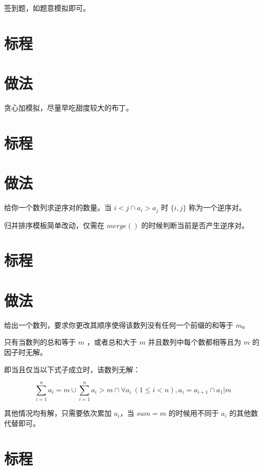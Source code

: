 \documentclass{../cpct/ctsol}
\begin{document}
签到题，如题意模拟即可。

\section*{标程}


\makesolution
\section*{做法}

贪心加模拟，尽量早吃甜度较大的布丁。

\section*{标程}


\makesolution
\section*{做法}

给你一个数列求逆序对的数量。当 $i < j \cap a_i > a_j$ 时 $\{i,j\}$ 称为一个逆序对。

归并排序模板简单改动，仅需在 $merge()$ 的时候判断当前是否产生逆序对。

\section*{标程}


\makesolution
\section*{做法}

给出一个数列，要求你更改其顺序使得该数列没有任何一个前缀的和等于 $m$。

只有当数列的总和等于 $m$ ，或者总和大于 $m$ 并且数列中每个数都相等且为 $m$ 的因子时无解。

即当且仅当以下式子成立时，该数列无解：

$$
\sum_{i=1}^{n}a_i=m \cup  \sum_{i=1}^{n}a_i>m  \cap \forall a_i~(1 \leq i < n),a_i=a_{i+1} \cap a_1 | m
$$

其他情况均有解，只需要依次累加 $a_i$，当 $sum=m$ 的时候用不同于 $a_i$ 的其他数代替即可。 

\section*{标程}
\end{document}
